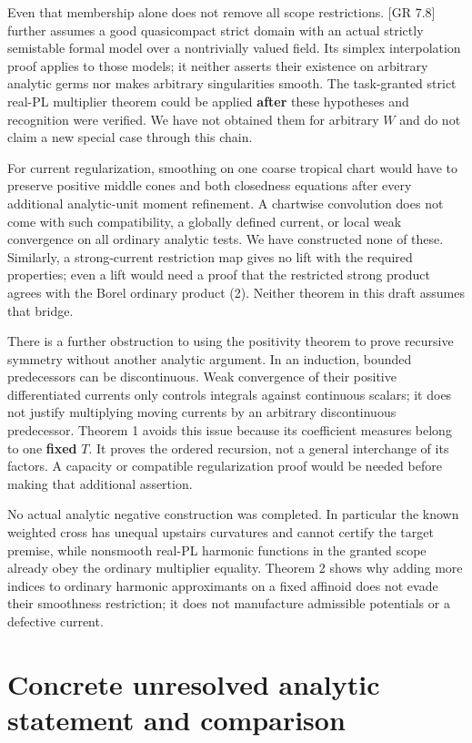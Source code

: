 \documentclass[
  11pt,
]{article}
\begin{document}
Even that membership alone does not remove all scope restrictions. {[}GR
7.8{]} further assumes a good quasicompact strict domain with an actual
strictly semistable formal model over a nontrivially valued field. Its
simplex interpolation proof applies to those models; it neither asserts
their existence on arbitrary analytic germs nor makes arbitrary
singularities smooth. The task-granted strict real-PL multiplier theorem
could be applied \textbf{after} these hypotheses and recognition were
verified. We have not obtained them for arbitrary \(W\) and do not claim
a new special case through this chain.

For current regularization, smoothing on one coarse tropical chart would
have to preserve positive middle cones and both closedness equations
after every additional analytic-unit moment refinement. A chartwise
convolution does not come with such compatibility, a globally defined
current, or local weak convergence on all ordinary analytic tests. We
have constructed none of these. Similarly, a strong-current restriction
map gives no lift with the required properties; even a lift would need a
proof that the restricted strong product agrees with the Borel ordinary
product (2). Neither theorem in this draft assumes that bridge.

There is a further obstruction to using the positivity theorem to prove
recursive symmetry without another analytic argument. In an induction,
bounded predecessors can be discontinuous. Weak convergence of their
positive differentiated currents only controls integrals against
continuous scalars; it does not justify multiplying moving currents by
an arbitrary discontinuous predecessor. Theorem 1 avoids this issue
because its coefficient measures belong to one \textbf{fixed} \(T\). It
proves the ordered recursion, not a general interchange of its factors.
A capacity or compatible regularization proof would be needed before
making that additional assertion.

No actual analytic negative construction was completed. In particular
the known weighted cross has unequal upstairs curvatures and cannot
certify the target premise, while nonsmooth real-PL harmonic functions
in the granted scope already obey the ordinary multiplier equality.
Theorem 2 shows why adding more indices to ordinary harmonic
approximants on a fixed affinoid does not evade their smoothness
restriction; it does not manufacture admissible potentials or a
defective current.

\section{Concrete unresolved analytic statement and
comparison}\label{concrete-unresolved-analytic-statement-and-comparison}
\end{document}
